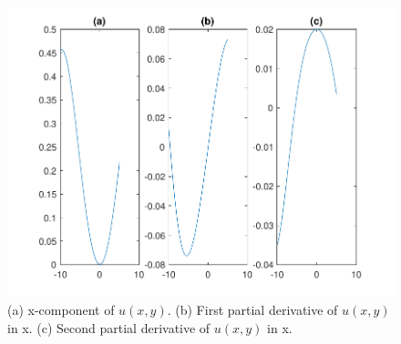 \documentclass[paper=a4, fontsize=12pt]{article} %
\begin{document}
\begin{figure}[H]
  \centering
  \includegraphics[width=\textwidth]{algebraicDeriv.pdf}
  \caption{\small (a) x-component of $u(x,y)$. (b) First partial derivative of $u(x,y)$ in x. (c) Second partial derivative of $u(x,y)$ in x.\label{fig:stretched}}
\end{figure}
\end{document}
